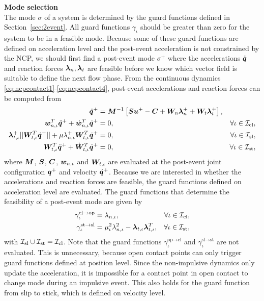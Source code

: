 \documentclass[../DC2019003Bouma.tex]{subfiles}
\begin{document}
\textbf{Mode selection}\\
The mode $\sigma$ of a system is determined by the guard functions defined in Section~\ref{sec:2event}. All guard functions $\gamma_\iota$ should be greater than zero for the system to be in a feasible mode. Because some of these guard functions are defined on acceleration level and the post-event acceleration is not constrained by the NCP, we should first find a post-event mode $\sigma^+$ where the accelerations $\ddot{{\boldsymbol{q}}}$ and reaction forces $\boldsymbol{\lambda}_{n},\boldsymbol{\lambda}_{t}$ are feasible before we know which vector field is suitable to define the next flow phase. From the continuous dynamics \eqref{eq:ncpcontact1}-\eqref{eq:ncpcontact4}, post-event accelerations and reaction forces can be computed from
\begin{align}
\ddot{{\boldsymbol{q}}}^+ &= {\boldsymbol{M}}^{-1}\left[{\boldsymbol{S}}{\boldsymbol{u}}^+ - {\boldsymbol{C}} + {\boldsymbol{W}}_{n}\boldsymbol{\lambda}^+_{n} + {\boldsymbol{W}}_{t}\boldsymbol{\lambda}^+_{t}\right], &  \label{eq:2nonimp1}\\
{\boldsymbol{w}}^T_{n,\iota}\ddot{{\boldsymbol{q}}}^+ + \dot{{\boldsymbol{w}}}^T_{n,\iota}\dot{{\boldsymbol{q}}}^+ &= 0, & \forall \iota\in\mathcal{I}_{\text{cl}},\label{eq:2nonimp2}\\
\boldsymbol{\lambda}^+_{t,\iota}||{\boldsymbol{W}}^T_{t,\iota}\dot{{\boldsymbol{q}}}^+|| + \mu\lambda^+_{n,\iota}{\boldsymbol{W}}^T_{t,\iota}\dot{{\boldsymbol{q}}}^+ &= 0, & \forall \iota\in\mathcal{I}_{\text{sl}},\label{eq:2nonimp3}\\
{\boldsymbol{W}}^T_{t,\iota}\ddot{{\boldsymbol{q}}}^+ + \dot{{\boldsymbol{W}}}^T_{t,\iota}\dot{{\boldsymbol{q}}}^+ &= 0, & \forall \iota\in\mathcal{I}_{\text{st}},\label{eq:2nonimp4}
\end{align}
where ${\boldsymbol{M}}$, ${\boldsymbol{S}}$, ${\boldsymbol{C}}$, ${\boldsymbol{w}}_{n,\iota}$ and ${\boldsymbol{W}}_{t,\iota}$ are evaluated at the post-event joint configuration ${\boldsymbol{q}}^+$ and velocity $\dot{{\boldsymbol{q}}}^+$. Because we are interested in whether the accelerations and reaction forces are feasible, the guard functions defined on acceleration level are evaluated. The guard functions that determine the feasibility of a post-event mode are given by
\begin{align}
\gamma^{\text{cl}\rightarrow\text{op}}_{\iota} &= \lambda_{n,\iota}, & \forall \iota\in\mathcal{I}_{\text{cl}},\\
\gamma^{\text{st}\rightarrow\text{sl}}_{\iota} &= \mu_{\iota}^2\lambda_{n,\iota}^2 - \boldsymbol{\lambda}_{t,\iota}\boldsymbol{\lambda}_{t,\iota}^T, & \forall \iota\in\mathcal{I}_{\text{st}},
\end{align}
with $\mathcal{I}_{\text{sl}}\cup\mathcal{I}_{\text{st}}=\mathcal{I}_{\text{cl}}$. Note that the guard functions $\gamma_{\iota}^{\text{op}\rightarrow\text{cl}}$ and $\gamma_{\iota}^{\text{sl}\rightarrow\text{st}}$ are not evaluated. This is unnecessary, because open contact points can only trigger guard functions defined at position level. Since the non-impulsive dynamics only update the acceleration, it is impossible for a contact point in open contact to change mode during an impulsive event. This also holds for the guard function from slip to stick, which is defined on velocity level.
\end{document}

